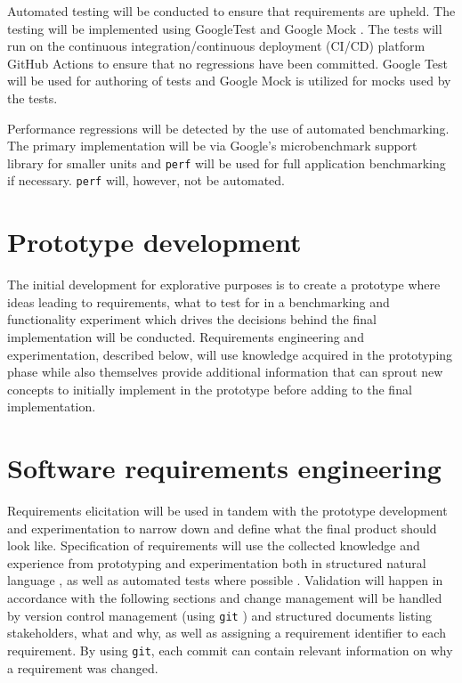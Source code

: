 Automated testing will be conducted to ensure that requirements are
upheld. The testing will be implemented using GoogleTest \cite{googletest}
and Google Mock \cite{googletest}. The tests will run on the
continuous integration/continuous deployment (CI/CD) platform
GitHub Actions \cite{github-actions} to ensure that no regressions
have been committed. Google Test will be used for authoring of
tests and Google Mock is utilized for mocks used by the tests.

Performance regressions will be detected by the use of automated
benchmarking. The primary implementation will be via Google's
microbenchmark support library \cite{google-benchmark} for smaller
units and \verb|perf| \cite{perf} will be used for full application
benchmarking if necessary. \verb|perf| will, however, not be
automated.

\section{Prototype development}
\label{sec:prototype-development}

The initial development for explorative purposes is to create a
prototype \cite[62]{sommerville-software-engineering} \cite[56]{thomas-hunt-pragmatic-programmer}
where ideas leading to requirements, what to test for in a
benchmarking and functionality experiment which drives the
decisions behind the final implementation will be conducted.
Requirements engineering and experimentation, described below, will
use knowledge acquired in the prototyping phase while also
themselves provide additional information that can sprout new
concepts to initially implement in the prototype before adding to
the final implementation.

\section{Software requirements engineering}
\label{sec:software-requirements-engineering}

Requirements elicitation will be used in tandem with the prototype
development and experimentation to narrow down and define what the
final product should look like. Specification of requirements will
use the collected knowledge and experience from prototyping and
experimentation both in structured natural language \cite[121]{sommerville-software-engineering},
as well as automated tests where possible \cite{test-cases-as-requirements}.
Validation will happen in accordance with the following sections
and change management will be handled by version control management
(using \verb|git| \cite{git}) and structured documents listing
stakeholders, what and why, as well as assigning a requirement
identifier to each requirement. By using \verb|git|, each commit
can contain relevant information on why a requirement was changed.

